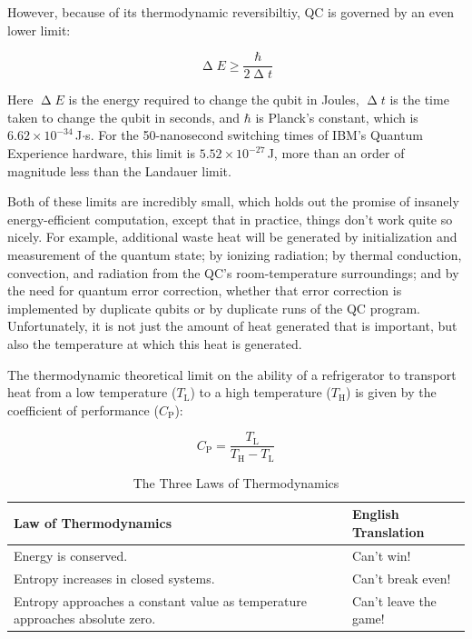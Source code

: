 However, because of its thermodynamic reversibiltiy,
QC is governed by an even lower limit:

\begin{equation}
	\upDelta E \geq \frac{\hbar}{2 \upDelta t}
\end{equation}

Here $\upDelta E$ is the energy required to change the qubit in Joules,
$\upDelta t$ is the time taken to change the qubit in seconds, and
$\hbar$ is Planck's constant, which is $6.62 \times 10^{-34}$\,J$\cdot$s.
For the 50-nanosecond switching times of IBM's Quantum Experience
hardware, this limit is $5.52 \times 10^{-27}$\,J, more than an order
of magnitude less than the Landauer limit.

Both of these limits are incredibly small, which holds out the promise
of insanely energy-efficient computation, except that
in practice, things don't work quite so nicely.
For example, additional waste heat will be generated
by initialization and measurement of the quantum state;
by ionizing radiation;
by thermal conduction, convection, and radiation from
the QC's room-temperature surroundings;
and
by the need for quantum error correction, whether that error correction
is implemented by duplicate qubits or by duplicate runs of the QC
program.
Unfortunately, it is not just the amount of heat generated that is
important, but also the temperature at which this heat is generated.

\newcommand{\TLo}{T_\mathrm{L}}
\newcommand{\THi}{T_\mathrm{H}}
\newcommand{\CPf}{C_\mathrm{P}}

The thermodynamic theoretical limit on the ability of a refrigerator
to transport heat from a low temperature ($\TLo$) to a high temperature
($\THi$) is given by the coefficient of performance ($\CPf$):

\begin{equation}
	\CPf = \frac{\TLo}{\THi - \TLo}
\end{equation}

\begin{table}
\renewcommand*{\arraystretch}{1.25}
\centering\footnotesize
\begin{tabular}{p{1.7in}p{0.95in}}
\toprule
Law of Thermodynamics
	& English Translation \\
\midrule
Energy is conserved.
	& Can't win! \\
Entropy increases in closed systems.
	& Can't break even! \\
Entropy approaches a constant value as temperature approaches absolute zero.
	& Can't leave the game! \\
\bottomrule
\end{tabular}
\caption{The Three Laws of Thermodynamics}
\label{tab:future:The Three Laws of Thermodynamics}
\end{table}


